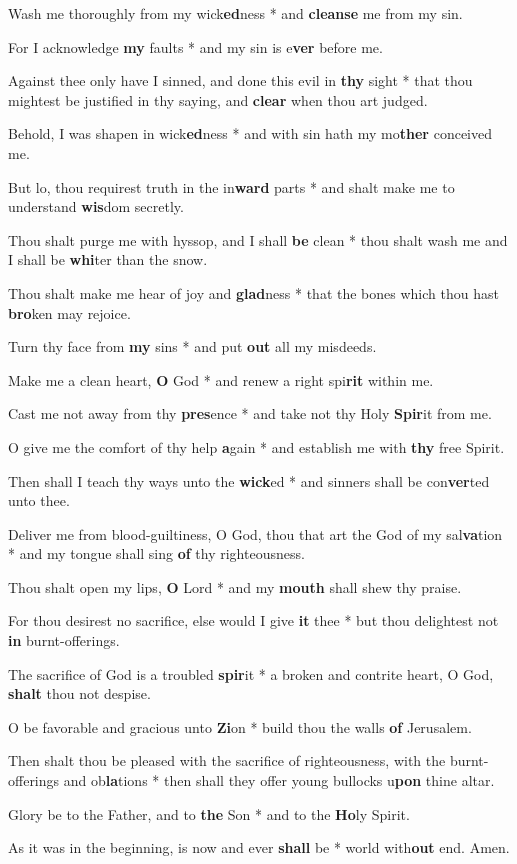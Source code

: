 \begin{multicols}{2}
	Wash me thoroughly from my wick\textbf{ed}ness * and \textbf{cleanse} me from my sin.
	
	For I acknowledge \textbf{my} faults * and my sin is e\textbf{ver} before me.
	
	Against thee only have I sinned, and done this evil in \textbf{thy} sight * that thou mightest be justified in thy saying, and \textbf{clear} when thou art judged.
	
	Behold, I was shapen in wick\textbf{ed}ness * and with sin hath my mo\textbf{ther} conceived me.
	
	But lo, thou requirest truth in the in\textbf{ward} parts * and shalt make me to understand \textbf{wis}dom secretly.
	
	Thou shalt purge me with hyssop, and I shall \textbf{be} clean * thou shalt wash me and I shall be \textbf{whi}ter than the snow.
	
	Thou shalt make me hear of joy and \textbf{glad}ness * that the bones which thou hast \textbf{bro}ken may rejoice.
	
	Turn thy face from \textbf{my} sins * and put \textbf{out} all my misdeeds.
	
	Make me a clean heart, \textbf{O} God * and renew a right spi\textbf{rit} within me.
	
	Cast me not away from thy \textbf{pres}ence * and take not thy Holy \textbf{Spir}it from me.
	
	O give me the comfort of thy help \textbf{a}gain * and establish me with \textbf{thy} free Spirit.
	
	Then shall I teach thy ways unto the \textbf{wick}ed * and sinners shall be con\textbf{ver}ted unto thee.
	
	Deliver me from blood-guiltiness, O God, thou that art the God of my sal\textbf{va}tion * and my tongue shall sing \textbf{of} thy righteousness.
	
	Thou shalt open my lips, \textbf{O} Lord * and my \textbf{mouth} shall shew thy praise.
	
	For thou desirest no sacrifice, else would I give \textbf{it} thee * but thou delightest not \textbf{in} burnt-offerings.
	
	The sacrifice of God is a troubled \textbf{spir}it * a broken and contrite heart, O God, \textbf{shalt} thou not despise.
	
	O be favorable and gracious unto \textbf{Zi}on * build thou the walls \textbf{of} Jerusalem.
	
	Then shalt thou be pleased with the sacrifice of righteousness, with the burnt-offerings and ob\textbf{la}tions * then shall they offer young bullocks u\textbf{pon} thine altar.
	
	Glory be to the Father, and to \textbf{the} Son * and to the \textbf{Ho}ly Spirit.
	
	As it was in the beginning, is now and ever \textbf{shall} be * world with\textbf{out} end. Amen.
\end{multicols}